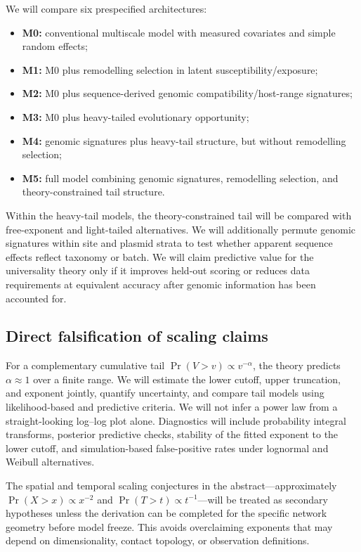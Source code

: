 \documentclass[12pt,a4paper]{article}
\newcommand{\Prob}{\Pr}
\begin{document}
We will compare six prespecified architectures:
\begin{itemize}
\item \textbf{M0:} conventional multiscale model with measured covariates and simple random effects;
\item \textbf{M1:} M0 plus remodelling selection in latent susceptibility/exposure;
\item \textbf{M2:} M0 plus sequence-derived genomic compatibility/host-range signatures;
\item \textbf{M3:} M0 plus heavy-tailed evolutionary opportunity;
\item \textbf{M4:} genomic signatures plus heavy-tail structure, but without remodelling selection;
\item \textbf{M5:} full model combining genomic signatures, remodelling selection, and theory-constrained tail structure.
\end{itemize}
Within the heavy-tail models, the theory-constrained tail will be compared with free-exponent and light-tailed alternatives. We will additionally permute genomic signatures within site and plasmid strata to test whether apparent sequence effects reflect taxonomy or batch. We will claim predictive value for the universality theory only if it improves held-out scoring or reduces data requirements at equivalent accuracy after genomic information has been accounted for.

\subsection{Direct falsification of scaling claims}

For a complementary cumulative tail $\Prob(V>v)\propto v^{-\alpha}$, the theory predicts $\alpha\approx1$ over a finite range. We will estimate the lower cutoff, upper truncation, and exponent jointly, quantify uncertainty, and compare tail models using likelihood-based and predictive criteria. We will not infer a power law from a straight-looking log--log plot alone. Diagnostics will include probability integral transforms, posterior predictive checks, stability of the fitted exponent to the lower cutoff, and simulation-based false-positive rates under lognormal and Weibull alternatives.

The spatial and temporal scaling conjectures in the abstract---approximately $\Prob(X>x)\propto x^{-2}$ and $\Prob(T>t)\propto t^{-1}$---will be treated as secondary hypotheses unless the derivation can be completed for the specific network geometry before model freeze. This avoids overclaiming exponents that may depend on dimensionality, contact topology, or observation definitions.
\end{document}
